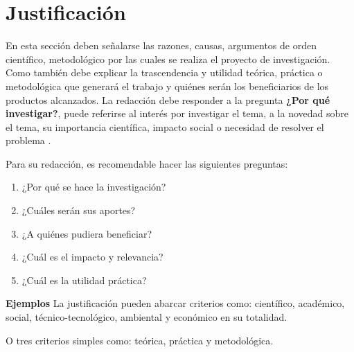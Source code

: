 \chapter{Justificación}
\label{Justificación}

En esta sección deben señalarse las razones, causas, argumentos de orden científico, metodológico por las cuales se realiza el proyecto de investigación. Como también debe explicar la trascendencia y utilidad teórica, práctica o metodológica que generará el trabajo y quiénes serán los beneficiarios de los productos  alcanzados. La redacción debe responder a la pregunta \textbf{¿Por qué investigar?}, puede referirse al interés por investigar el tema, a la novedad sobre el tema, su importancia  científica, impacto social o necesidad de resolver el problema \cite{herrera2004tutoria}.

Para su redacción, es recomendable hacer las siguientes preguntas:
\begin{enumerate}
    \item ¿Por qué se hace la investigación?
    \item ¿Cuáles serán sus aportes?
    \item ¿A quiénes pudiera beneficiar?
    \item ¿Cuál es el impacto y relevancia?
    \item ¿Cuál es la utilidad práctica?
\end{enumerate}

\textbf{Ejemplos}
La justificación pueden abarcar criterios como: científico, académico, social, técnico-tecnológico, ambiental y económico en su totalidad.

O tres criterios simples como: teórica, práctica y metodológica. 


